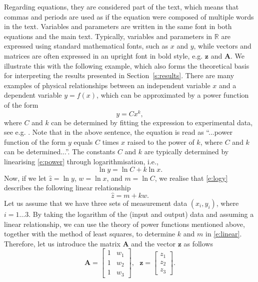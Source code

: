 \documentclass[a4paper]{article}
\begin{document}
Regarding equations, they are considered part of the text, which means that commas and periods are used as if the equation were composed of multiple words in the text. Variables and parameters are written in the same font in both equations and the main text. Typically, variables and parameters in $\mathbb{R}$ are expressed using standard mathematical fonts, such as $x$ and $y$, while vectors and matrices are often expressed in an upright font in bold style, e.g. $\mathbf{z}$ and $\mathbf{A}$. We illustrate this with the following example, which also forms the theoretical basis for interpreting the results presented in Section~\ref{s:results}. There are many examples of physical relationships between an independent variable $x$ and a dependent variable $y=f(x)$, which can be approximated by a power function of the form
%
\begin{equation} \label{e:power}
    y=C x^k,
\end{equation}
%
where $C$ and $k$ can be determined by fitting the expression to experimental data, see e.g. \cite{Adams2021}. Note that in the above sentence, the equation is read as ``...power function of the form $y$ equals $C$ times $x$ raised to the power of $k$, where $C$ and $k$ can be determined...''. The constants $C$ and $k$ are typically determined by linearising \eqref{e:power} through logarithmisation, i.e.,
%
\begin{equation}\label{e:logy}
    \ln y = \ln C + k \ln x.
\end{equation}
%
Now, if we let $\hat{z}=\ln y$, $w=\ln x$, and $m=\ln C$, we realise that \eqref{e:logy} describes the following linear relationship
%
\begin{equation}\label{e:linear}
    \hat{z} = m + k w.
\end{equation}
%
Let us assume that we have three sets of measurement data $(x_i, y_i)$, where $i=1\ldots3$. By taking the logarithm of the (input and output) data and assuming a linear relationship, we can use the theory of power functions mentioned above, together with the method of least squares, to determine $k$ and $m$ in \eqref{e:linear}. Therefore, let us introduce the matrix $\mathbf{A}$ and the vector $\mathbf{z}$ as follows
%
\begin{equation}
    \mathbf{A}=\begin{bmatrix}
    1&w_1\\
    1&w_2\\
    1&w_3
    \end{bmatrix},
~~~
    \mathbf{z}=\begin{bmatrix}
    z_1\\
    z_2\\
    z_3
    \end{bmatrix}.
\end{equation}
\end{document}
